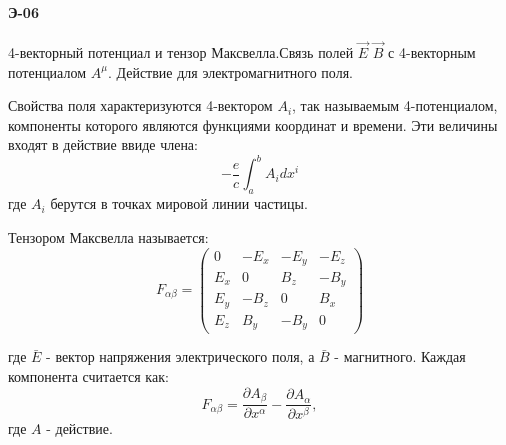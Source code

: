 \documentclass[__main__.tex]{subfiles}
\begin{document}
\paragraph{Э-06}
4-векторный потенциал и тензор Максвелла.Связь полей $\vec{E}$ $\vec{B}$ с 4-векторным потенциалом $A^μ$. Действие для электромагнитного поля.\

\begin{definition}
	Свойства поля характеризуются 4-вектором $A_i$, так называемым 4-потенциалом, компоненты которого являются функциями координат и времени. Эти величины входят в действие ввиде члена:
	$$-\frac{e}{c}\int_{a}^{b}A_idx^i$$
	где $A_i$ берутся в точках мировой линии частицы. 
\end{definition}

\begin{definition}
	Тензором Максвелла называется: 
	$$F_{\alpha\beta}=
	\begin{pmatrix}
	0 & -E_x & -E_y & -E_z\\
	E_x & 0 & B_z & -B_y\\
	E_y & -B_z & 0 & B_x\\
	E_z & B_y & -B_y & 0
	\end{pmatrix}$$
\end{definition}

где $\bar E$ - вектор напряжения электрического поля, а $\bar B$ - магнитного.
Каждая компонента считается как:
$$
F_{\alpha\beta}=\frac{\partial A_\beta}{\partial x^{\alpha}}
-\frac{\partial A_\alpha}{\partial x^{\beta}},
$$
где $A$ - действие.
\end{document}
